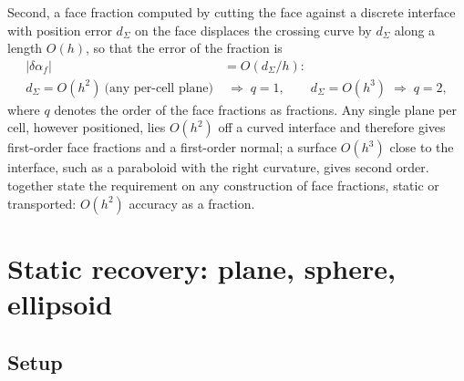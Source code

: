 \documentclass[preprint,12pt]{elsarticle}
\begin{document}
Second, a face fraction computed by cutting the face against a discrete interface with position error $d_\Sigma$ on the face displaces the crossing curve by $d_\Sigma$ along a length $O(h)$, so that the error of the fraction is
\begin{equation}
\begin{aligned}
|\delta\alpha_f| &= O(d_\Sigma/h): \\
d_\Sigma = O(h^2)\ \text{(any per-cell plane)} &\;\Rightarrow\; q = 1, \qquad
d_\Sigma = O(h^3) \;\Rightarrow\; q = 2,
\end{aligned}
\label{eq:clipping-law}
\end{equation}
where $q$ denotes the order of the face fractions as fractions. Any single plane per cell, however positioned, lies $O(h^2)$ off a curved interface and therefore gives first-order face fractions and a first-order normal; a surface $O(h^3)$ close to the interface, such as a paraboloid with the right curvature, gives second order.  together state the requirement on any construction of face fractions, static or transported: $O(h^2)$ accuracy as a fraction.

\section{Static recovery: plane, sphere, ellipsoid}
\label{sec:static}

\subsection{Setup}
\end{document}
